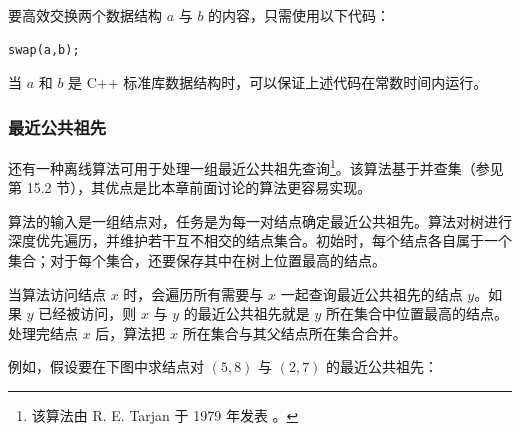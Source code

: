 要高效交换两个数据结构 $a$ 与 $b$ 的内容，只需使用以下代码：
\begin{lstlisting}
swap(a,b);
\end{lstlisting}
当 $a$ 和 $b$ 是 C++ 标准库数据结构时，可以保证上述代码在常数时间内运行。

\subsubsection{最近公共祖先}

还有一种离线算法可用于处理一组最近公共祖先查询\footnote{该算法由 R. E. Tarjan 于 1979 年发表 \cite{tar79}。}。该算法基于并查集（参见第 15.2 节），其优点是比本章前面讨论的算法更容易实现。

算法的输入是一组结点对，任务是为每一对结点确定最近公共祖先。算法对树进行深度优先遍历，并维护若干互不相交的结点集合。初始时，每个结点各自属于一个集合；对于每个集合，还要保存其中在树上位置最高的结点。

当算法访问结点 $x$ 时，会遍历所有需要与 $x$ 一起查询最近公共祖先的结点 $y$。如果 $y$ 已经被访问，则 $x$ 与 $y$ 的最近公共祖先就是 $y$ 所在集合中位置最高的结点。处理完结点 $x$ 后，算法把 $x$ 所在集合与其父结点所在集合合并。

例如，假设要在下图中求结点对 $(5,8)$ 与 $(2,7)$ 的最近公共祖先：
\begin{center}
\end{center}

